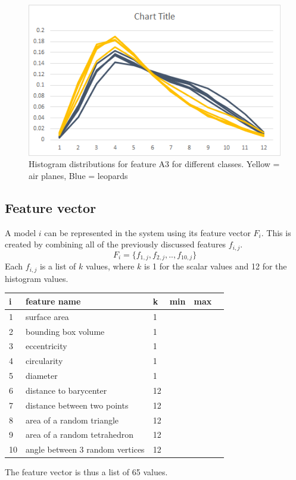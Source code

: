 \documentclass{bigdata}
\begin{document}
\begin{figure}[h!]
    \includegraphics[width=\linewidth]{Pictures/Part3/A3.png}
    \caption{Histogram distributions for feature A3 for different classes. Yellow = air planes, Blue = leopards}
  \label{fig:eccentricity}
\end{figure}

\subsection{Feature vector}
A model $i$ can be represented in the system using its feature vector $F_i$. This is created by combining all of the previously discussed features $f_{i,j}$.
\begin{equation}
F_i = \{f_{1,j}, f_{2,j}, .. , f_{10,j}\}
\end{equation}
Each $f_{i,j}$ is a list of $k$ values, where $k$ is 1 for the scalar values and 12 for the histogram values.

\begin{center}
\begin{tabular}
{ l | l | l | l | l | l}
i & feature name & k & min & max\\ \hline
1 & surface area & 1 \\
2 & bounding box volume & 1 \\
3 & eccentricity & 1 \\
4 & circularity & 1 \\
5 & diameter & 1 \\
6 & distance to barycenter & 12 \\
7 & distance between two points & 12 \\
8 & area of a random triangle & 12 \\
9 & area of a random tetrahedron & 12 \\
10 & angle between 3 random vertices & 12 \\
\end{tabular}
\end{center}
The feature vector is thus a list of 65 values.
\end{document}
